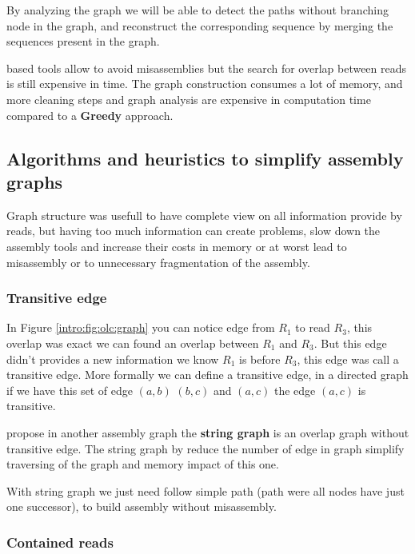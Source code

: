 \documentclass[main]{subfiles}
\begin{document}
By analyzing the graph we will be able to detect the paths without branching node in the graph, and reconstruct the corresponding sequence by merging the sequences present in the graph.

\OLC based tools allow to avoid misassemblies but the search for overlap between reads is still expensive in time. The graph construction consumes a lot of memory, and more cleaning steps and graph analysis are expensive in computation time compared to a \textbf{Greedy} approach. 

\subsection{Algorithms and heuristics to simplify assembly graphs}

Graph structure was usefull to have complete view on all information provide by reads, but having too much information can create problems, slow down the assembly tools and increase their costs in memory or at worst lead to misassembly or to unnecessary fragmentation of the assembly.

\subsubsection{Transitive edge}  \label{intro:subsubsec:transitive_edge}

In Figure \ref{intro:fig:olc:graph} you can notice edge from $R_1$ to read $R_3$, this overlap was exact we can found an overlap between $R_1$ and $R_3$. But this edge didn't provides a new information we know $R_1$ is before $R_3$, this edge was call a transitive edge. More formally we can define a transitive edge, in a directed graph if we have this set of edge $(a, b)$ $(b, c)$ and $(a, c)$ the edge $(a, c)$ is transitive.

\citeauthor{string_graph} propose in \cite{string_graph} another assembly graph the \textbf{string graph} is an overlap graph without transitive edge. The string graph by reduce the number of edge in graph simplify traversing of the graph and memory impact of this one.

With string graph we just need follow simple path (path were all nodes have just one successor), to build assembly without misassembly.

\subsubsection{Contained reads} \label{intro:subsubsec:contained_reads}
\end{document}
